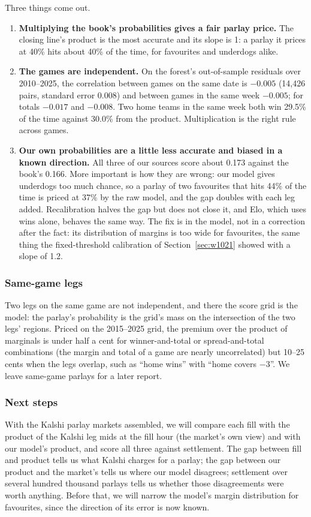 Three things come out.
\begin{enumerate}[nosep]
\item \textbf{Multiplying the book's probabilities gives a fair parlay price.} The closing line's product is the most accurate and its slope is 1: a parlay it prices at 40\% hits about 40\% of the time, for favourites and underdogs alike.
\item \textbf{The games are independent.} On the forest's out-of-sample residuals over 2010--2025, the correlation between games on the same date is $-0.005$ (14,426 pairs, standard error 0.008) and between games in the same week $-0.005$; for totals $-0.017$ and $-0.008$. Two home teams in the same week both win 29.5\% of the time against 30.0\% from the product. Multiplication is the right rule across games.
\item \textbf{Our own probabilities are a little less accurate and biased in a known direction.} All three of our sources score about 0.173 against the book's 0.166. More important is how they are wrong: our model gives underdogs too much chance, so a parlay of two favourites that hits 44\% of the time is priced at 37\% by the raw model, and the gap doubles with each leg added. Recalibration halves the gap but does not close it, and Elo, which uses wins alone, behaves the same way. The fix is in the model, not in a correction after the fact: its distribution of margins is too wide for favourites, the same thing the fixed-threshold calibration of Section~\ref{sec:w1021} showed with a slope of 1.2.
\end{enumerate}

\subsubsection{Same-game legs}

Two legs on the same game are not independent, and there the score grid is the model: the parlay's probability is the grid's mass on the intersection of the two legs' regions. Priced on the 2015--2025 grid, the premium over the product of marginals is under half a cent for winner-and-total or spread-and-total combinations (the margin and total of a game are nearly uncorrelated) but 10--25 cents when the legs overlap, such as ``home wins'' with ``home covers $-3$''. We leave same-game parlays for a later report.

\subsubsection{Next steps}

With the Kalshi parlay markets assembled, we will compare each fill with the product of the Kalshi leg mids at the fill hour (the market's own view) and with our model's product, and score all three against settlement. The gap between fill and product tells us what Kalshi charges for a parlay; the gap between our product and the market's tells us where our model disagrees; settlement over several hundred thousand parlays tells us whether those disagreements were worth anything. Before that, we will narrow the model's margin distribution for favourites, since the direction of its error is now known.
